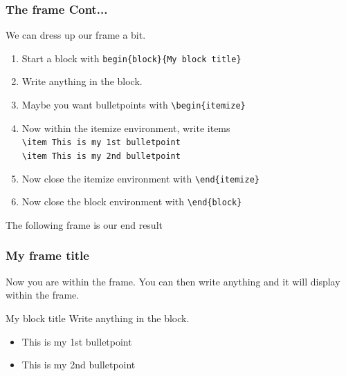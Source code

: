 \documentclass[nogin]{beamer}\usepackage[]{graphicx}\usepackage[]{color}
\begin{document}
\begin{frame}[fragile]
\frametitle{The frame Cont...}
\footnotesize
We can dress up our frame a bit.
\begin{enumerate}
\item Start a block with \verb|begin{block}{My block title}|
\item Write anything in the block.
\item Maybe you want bulletpoints with \verb|\begin{itemize}|
\item Now within the itemize environment, write items\\
\verb|\item This is my 1st bulletpoint|\\
\verb|\item This is my 2nd bulletpoint|\\
\item Now close the itemize environment with \verb|\end{itemize}|
\item Now close the block environment with \verb|\end{block}|
\end{enumerate}
The following frame is our end result
\end{frame}

\begin{frame}[fragile]
\frametitle{My frame title}
Now you are within the frame. You can then write anything and it will display within the frame.
\begin{block}{My block title}
Write anything in the block.
\begin{itemize}
\item This is my 1st bulletpoint
\item This is my 2nd bulletpoint
\end{itemize}
\end{block}
\end{frame}
\end{document}
